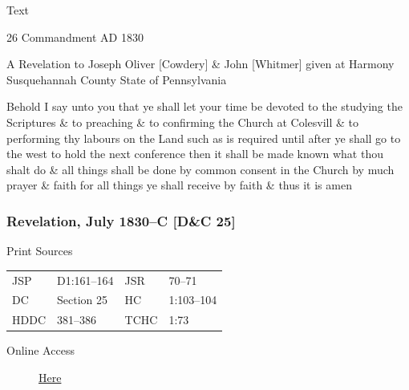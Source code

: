 			\begin{description}
				\item[Text]
			\end{description}
			
				\begin{tightcenter}
				26 Commandment AD 1830
				\end{tightcenter}
				
				A Revelation to Joseph Oliver [Cowdery] \& John [Whitmer] given at Harmony Susquehannah County State of Pennsylvania
				
				Behold I say unto you that ye shall let your time be devoted to the studying the Scriptures \& to preaching \& to confirming the Church at Colesvill \& to performing thy labours on the Land such as is required until after ye shall go to the west to hold the next conference then it shall be made known what thou shalt do \& all things shall be done by common consent in the Church by much prayer \& faith for all things ye shall receive by faith \& thus it is amen
				
		\subsubsection{Revelation, July 1830--C [D\&C 25]}
			\label{EMS-1830-JS-JUL-1830-C}
		
			\begin{description}
				\item[Print Sources]
			\end{description}

				\begin{tabular}{p{0.5in}p{1in}p{0.5in}p{1in}}
				JSP	 	& D1:161--164	& JSR 		& 70--71		\\
				DC	 	& Section 25	& HC 		& 1:103--104 	\\
				HDDC 	& 381--386		& TCHC 		& 1:73 			\\
				\end{tabular}
			
			\begin{description}
				\item[Online Access] \href{https://www.josephsmithpapers.org/paper-summary/revelation-july-1830-c-dc-25/1}{Here}
			\end{description}
			
